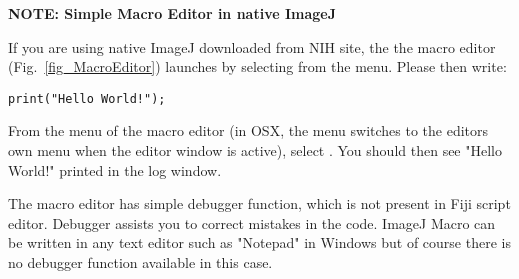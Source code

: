 \textbf{NOTE: Simple Macro Editor in native ImageJ}
\label{part:nativeeditor}

If you are using native ImageJ downloaded from NIH site, the the macro editor (Fig.~\ref{fig_MacroEditor}) launches by selecting  from the menu. Please then write:

\verb+print("Hello World!");+

From the menu of the macro editor (in OSX, the menu switches to the editors own menu when the editor window is active), select . You should then see "Hello World!" printed in the log window.

The macro editor has simple debugger function, which is not present in Fiji script editor. Debugger assists you to correct mistakes in the code. ImageJ Macro can be written in any text editor such as "Notepad" in Windows but of course there is no debugger function available in this case.